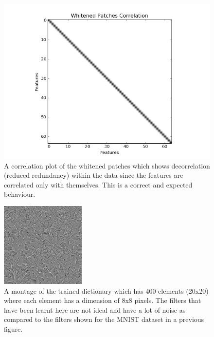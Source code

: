 \documentclass[	DIV=calc,%
				paper=a4,%
				fontsize=11pt,%
				twocolumn]{scrartcl}	 %
\begin{document}
 
\begin{figure}[H]
    \centering
    \includegraphics[width=0.7\linewidth]{data/sc_data/sc_atwork_whitened_patches_correlation.png}
    \caption{A correlation plot of the whitened patches which shows decorrelation (reduced redundancy) within the data since the features are correlated only with themselves. This is a correct and expected behaviour.}
    \label{sc_atwork_whitened_patches_correlation}
\end{figure}

\begin{figure}[H]
    \centering
    \includegraphics[width=0.5\linewidth]{data/sc_data/sc_atwork_dictionary.jpg}
    \caption{A montage of the trained dictionary which has 400 elements (20x20) where each element has a dimension of 8x8 pixels. The filters that have been learnt here are not ideal and have a lot of noise  as compared to the filters shown for the MNIST dataset in a previous figure.}
    \label{sc_atwork_dictionary}
\end{figure}
\end{document}
